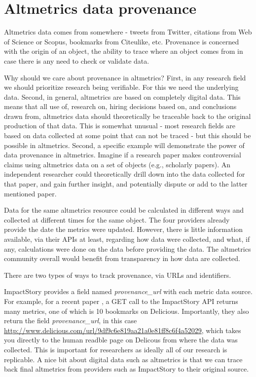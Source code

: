 \documentclass[letterpaper,superscriptaddress,showkeys,longbibliography]{revtex4-1}\usepackage{graphicx, color}
\begin{document}
\section*{Altmetrics data provenance}

Altmetrics data comes from somewhere - tweets from Twitter, citations from Web of Science or Scopus, bookmarks from Citeulike, etc. Provenance is concerned with the origin of an object, the ability to trace where an object comes from in case there is any need to check or validate data. 

Why should we care about provenance in altmetrics?  First, in any research field we should prioritize research being verifiable. For this we need the underlying data. Second, in general, altmetrics are based on completely digital data. This means that all use of, research on, hiring decisions based on, and conclusions drawn from, altmetrics data should theoretically be traceable back to the original production of that data. This is somewhat unusual - most research fields are based on data collected at some point that can not be traced - but this should be possible in altmetrics. Second, a specific example will demonstrate the power of data provenance in altmetrics. Imagine if a research paper makes controversial claims using altmetrics data on a set of objects (e.g., scholarly papers). An independent researcher could theoretically drill down into the data collected for that paper, and gain further insight, and potentially dispute or add to the latter mentioned paper.

Data for the same altmetrics resource could be calculated in different ways and collected at different times for the same object. The four providers already provide the date the metrics were updated. However, there is little information available, via their APIs at least, regarding how data were collected, and what, if any, calculations were done on the data before providing the data. The altmetrics community overall would benefit from transparency in how data are collected. 

There are two types of ways to track provenance, via URLs and identifiers. 

ImpactStory provides a field named \emph{provenance\_url} with each metric data source. For example, for a recent paper \cite{piwowar2007}, a GET call to the ImpactStory API returns many metrics, one of which is 10 bookmarks on Delicious. Importantly, they also return the field \emph{provenance\_url}, in this case \url{http://www.delicious.com/url/9df9c6e819aa21a0e81ff8c6f4a52029}, which takes you directly to the human readble page on Delicous from where the data was collected. This is important for researchers as ideally all of our research is replicable. A nice bit about digital data such as altmetrics is that we can trace back final altmetrics from providers such as ImpactStory to their original source.
\end{document}

